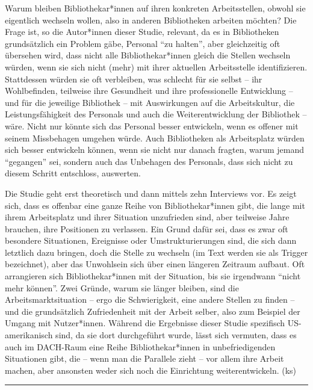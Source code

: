 \documentclass[a4paper,
fontsize=11pt,
oneside,
numbers=noperiodatend,
parskip=half-,
bibliography=totoc,
final
]{scrartcl}
\begin{document}
Warum bleiben Bibliothekar*innen auf ihren konkreten Arbeitsstellen,
obwohl sie eigentlich wechseln wollen, also in anderen Bibliotheken
arbeiten möchten? Die Frage ist, so die Autor*innen dieser Studie,
relevant, da es in Bibliotheken grundsätzlich ein Problem gäbe, Personal
\enquote{zu halten}, aber gleichzeitig oft übersehen wird, dass nicht
alle Bibliothekar*innen gleich die Stellen wechseln würden, wenn sie
sich nicht (mehr) mit ihrer aktuellen Arbeitsstelle identifizieren.
Stattdessen würden sie oft verbleiben, was schlecht für sie selbst --
ihr Wohlbefinden, teilweise ihre Gesundheit und ihre professionelle
Entwicklung -- und für die jeweilige Bibliothek -- mit Auswirkungen auf
die Arbeitskultur, die Leistungsfähigkeit des Personals und auch die
Weiterentwicklung der Bibliothek -- wäre. Nicht nur könnte sich das
Personal besser entwickeln, wenn es offener mit seinem Missbehagen
umgehen würde. Auch Bibliotheken als Arbeitsplatz würden sich besser
entwickeln können, wenn sie nicht nur danach fragten, warum jemand
\enquote{gegangen} sei, sondern auch das Unbehagen des Personals, dass
sich nicht zu diesem Schritt entschloss, auswerten.

Die Studie geht erst theoretisch und dann mittels zehn Interviews vor.
Es zeigt sich, dass es offenbar eine ganze Reihe von Bibliothekar*innen
gibt, die lange mit ihrem Arbeitsplatz und ihrer Situation unzufrieden
sind, aber teilweise Jahre brauchen, ihre Positionen zu verlassen. Ein
Grund dafür sei, dass es zwar oft besondere Situationen, Ereignisse oder
Umstrukturierungen sind, die sich dann letztlich dazu bringen, doch die
Stelle zu wechseln (im Text werden sie als Trigger bezeichnet), aber das
Unwohlsein sich über einen längeren Zeitraum aufbaut. Oft arrangieren
sich Bibliothekar*innen mit der Situation, bis sie irgendwann
\enquote{nicht mehr können}. Zwei Gründe, warum sie länger bleiben, sind
die Arbeitsmarktsituation -- ergo die Schwierigkeit, eine andere Stellen
zu finden -- und die grundsätzlich Zufriedenheit mit der Arbeit selber,
also zum Beispiel der Umgang mit Nutzer*innen. Während die Ergebnisse
dieser Studie spezifisch US-amerikanisch sind, da sie dort durchgeführt
wurde, lässt sich vermuten, dass es auch im DACH-Raum eine Reihe
Bibliothekar*innen in unbefriedigenden Situationen gibt, die -- wenn man
die Parallele zieht -- vor allem ihre Arbeit machen, aber ansonsten
weder sich noch die Einrichtung weiterentwickeln. (ks)

\begin{center}\rule{0.5\linewidth}{0.5pt}\end{center}
\end{document}
